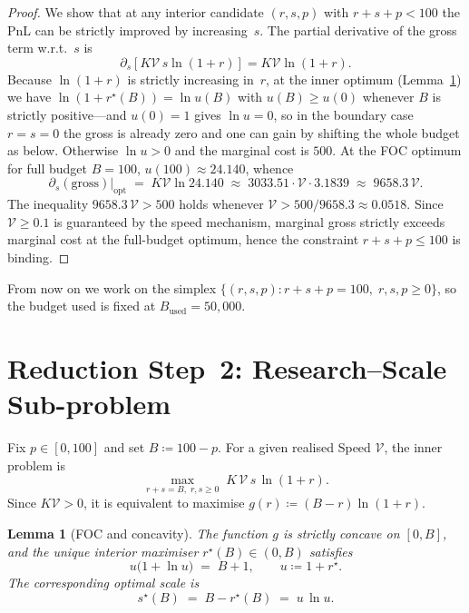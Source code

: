 \documentclass[11pt,a4paper]{article}
\newtheorem{lemma}[proposition]{Lemma}
\theoremstyle{definition}
\theoremstyle{remark}
\newcommand{\Sp}{\mathcal{V}}
\begin{document}
\begin{proof}
We show that at any interior candidate \((r,s,p)\) with \(r+s+p<100\) the PnL
can be strictly improved by increasing~\(s\). The partial derivative of the
gross term w.r.t.~\(s\) is
\[
\partial_s[K\Sp\, s\ln(1+r)]=K\Sp\ln(1+r).
\]
Because \(\ln(1+r)\) is strictly increasing in~\(r\), at the inner optimum
(Lemma~\ref{lem:foc}) we have \(\ln(1+r^\star(B))=\ln u(B)\) with
\(u(B)\ge u(0)\) whenever \(B\) is strictly positive---and \(u(0)=1\) gives
\(\ln u=0\), so in the boundary case \(r=s=0\) the gross is already zero and
one can gain by shifting the whole budget as below. Otherwise \(\ln u>0\) and
the marginal cost is \(500\). At the FOC optimum for full budget
\(B=100\), \(u(100)\approx 24.140\), whence
\[
\partial_s(\text{gross})\big|_{\text{opt}}\;=\;K\Sp\ln 24.140
\;\approx\;3033.51\cdot\Sp\cdot 3.1839\;\approx\;9658.3\,\Sp.
\]
The inequality \(9658.3\,\Sp>500\) holds whenever \(\Sp>500/9658.3\approx 0.0518\).
Since \(\Sp\ge 0.1\) is guaranteed by the speed mechanism, marginal gross
strictly exceeds marginal cost at the full-budget optimum, hence the constraint
\(r+s+p\le 100\) is binding.
\end{proof}

From now on we work on the simplex \(\{(r,s,p):r+s+p=100,\;r,s,p\ge 0\}\),
so the budget used is fixed at \(B_{\mathrm{used}}=50{,}000\).

\section{Reduction Step~2: Research--Scale Sub-problem}

Fix \(p\in[0,100]\) and set \(B\coloneqq 100-p\). For a given realised Speed
\(\Sp\), the inner problem is
\begin{equation}\label{eq:innerP}
\max_{r+s=B,\;r,s\ge 0}\; K\,\Sp\,s\,\ln(1+r).
\end{equation}
Since \(K\Sp>0\), it is equivalent to maximise \(g(r)\coloneqq (B-r)\ln(1+r)\).

\begin{lemma}[FOC and concavity]\label{lem:foc}
The function \(g\) is strictly concave on \([0,B]\), and the unique interior
maximiser \(r^\star(B)\in(0,B)\) satisfies
\begin{equation}\label{eq:FOC}
\boxed{\;u\bigl(1+\ln u\bigr) \;=\; B+1,\qquad u\coloneqq 1+r^\star.\;}
\end{equation}
The corresponding optimal scale is
\begin{equation}\label{eq:scaleopt}
s^\star(B) \;=\; B - r^\star(B) \;=\; u\,\ln u.
\end{equation}
\end{lemma}
\end{document}
